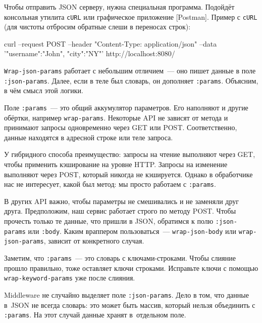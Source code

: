 \fi


Чтобы отправить JSON серверу, нужна специальная программа. Подойдёт консольная
утилита \verb|cURL| или графическое приложение
[Post\-man]. Пример с
\verb|cURL| (для чистоты отбросим обратные слеши в переносах строк):

\begin{english}
  \begin{bash}
curl --request POST
     --header "Content-Type:
                 application/json"
     --data '{"username":"John",
                      "city":"NY"}'
     http://localhost:8080/
  \end{bash}
\end{english}

\verb|Wrap-json-params| работает с небольшим отличием~--- оно пишет
данные в поле \verb|:json-params|. Далее, если в теле был словарь, он дополняет
\verb|:params|. Объясним, в чём смысл этой логики.

Поле \verb|:params|~--- это общий аккумулятор параметров. Его наполняют и другие
обёртки, например \verb|wrap-params|. Некоторые API не зависят от метода и
принимают запросы одновременно через GET или POST. Соответственно, данные
находятся в адресной строке или теле запроса.

У гибридного способа преимущество: запросы на чтение выполняют через GET, чтобы
применить кэширование на уровне HTTP. Запросы на изменение выполняют через POST,
который никогда не кэшируется. Однако в обработчике нас не интересует, какой был
метод: мы просто работаем с \verb|:params|.

В других API важно, чтобы параметры не смешивались и не заменяли друг
друга. Предположим, наш сервис работает строго по методу POST. Чтобы прочесть
только те данные, что пришли в JSON, обратимся к полю \verb|:json-params| или
\verb|:body|. Каким враппером пользоваться~--- \verb|wrap-json-body| или
\verb|wrap-json-params|, зависит от конкретного случая.


Заметим, что \verb|:params|~--- это словарь с клю\-ча\-ми-стро\-ка\-ми. Чтобы слияние
прошло правильно, \verb|| тоже оставляет ключи
строками. Исправьте ключи с помощью \texttt{wrap-keyword-params} уже после
слияния.

Middleware не случайно выделяет поле \texttt{:json\--pa\-rams}. Дело в том, что данные
в~JSON не всегда словарь: это может быть массив, который нельзя объединить с
\verb|:params|. На этот случай данные хранят в~отдельном поле.

